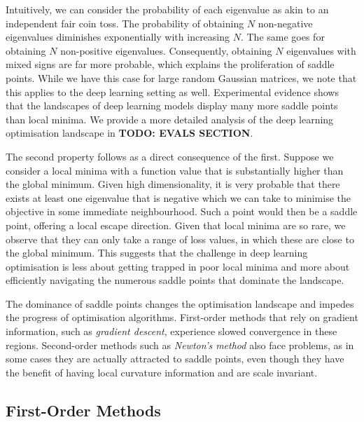 Intuitively, we can consider the probability of each eigenvalue as akin to an independent fair coin toss. The probability of obtaining $N$ non-negative eigenvalues diminishes exponentially with increasing $N$. The same goes for obtaining $N$ non-positive eigenvalues. Consequently, obtaining $N$ eigenvalues with mixed signs are far more probable, which explains the proliferation of saddle points. While we have this case for large random Gaussian matrices, we note that this applies to the deep learning setting as well. Experimental evidence shows that the landscapes of deep learning models display many more saddle points than local minima. We provide a more detailed analysis of the deep learning optimisation landscape in \textbf{TODO: EVALS SECTION}.

The second property follows as a direct consequence of the first. Suppose we consider a local minima with a function value that is substantially higher than the global minimum. Given high dimensionality, it is very probable that there exists at least one eigenvalue that is negative which we can take to minimise the objective in some immediate neighbourhood. Such a point would then be a saddle point, offering a local escape direction. Given that local minima are so rare, we observe that they can only take a range of loss values, in which these are close to the global minimum. This suggests that the challenge in deep learning optimisation is less about getting trapped in poor local minima and more about efficiently navigating the numerous saddle points that dominate the landscape. 

The dominance of saddle points changes the optimisation landscape and impedes the progress of optimisation algorithms. First-order methods that rely on gradient information, such as \textit{gradient descent}, experience slowed convergence in these regions. Second-order methods such as \textit{Newton's method} also face problems, as in some cases they are actually attracted to saddle points, even though they have the benefit of having local curvature information and are scale invariant. 

\subsection{First-Order Methods}
\label{ssec:first_order_methods}

